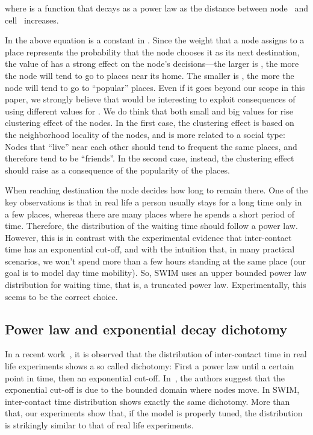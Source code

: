 \documentclass[conference]{IEEEtran}
\begin{document}
where  is a function that decays as a power law as
the distance between node~ and cell~ increases.

In the above equation  is a constant in . Since the weight that a
node assigns to a place represents the probability that the node chooses it as
its next destination, the value of  has a strong effect on the node's
decisions---the larger is , the more the node will tend to go to places
near its home. The smaller is , the more the node will tend to go to
``popular'' places. Even if it goes beyond our scope in this paper, we strongly
believe that would be interesting to exploit consequences of using different
values for . We do think that both small and big values for 
rise clustering effect of the nodes. In the first case, the clustering effect
is based on the neighborhood locality of the nodes, and is more related to a
social type: Nodes that ``live'' near each other should tend to frequent the
same places, and therefore tend to be ``friends''. In the second case, instead,
the clustering effect should raise as a consequence of the popularity of the
places.

When reaching destination the node decides how long to remain there. One of the
key observations is that in real life a person usually stays for a long time
only in a few places, whereas there are many places where he spends a short
period of time. Therefore, the distribution of the waiting time should follow a
power law. However, this is in contrast with the experimental evidence that
inter-contact time has an exponential cut-off, and with the intuition that, in
many practical scenarios, we won't spend more than a few hours standing at the
same place (our goal is to model day time mobility). So, SWIM uses an upper
bounded power law distribution for waiting time, that is, a truncated power law.
Experimentally, this seems to be the correct choice.

\subsection{Power law and exponential decay dichotomy}

In a recent work~\cite{milan07}, it is observed that the distribution of
inter-contact time in real life experiments shows a so  called dichotomy: First
a power law until a certain point in time, then an exponential cut-off.
In~\cite{cai07mobicom}, the authors suggest that the exponential cut-off is due
to the bounded domain where nodes move. In SWIM, inter-contact time distribution
shows exactly the same dichotomy. More than that, our experiments show that, if
the model is properly tuned, the distribution is strikingly similar to that of
real life experiments.
\end{document}

